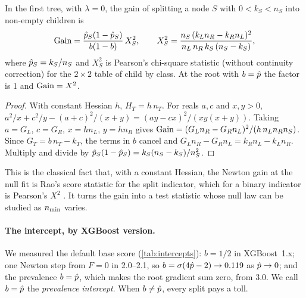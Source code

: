 \begin{proposition}\label{prop:chi2}
In the first tree, with $\lambda = 0$, the gain of splitting a node $S$ with $0 < k_S < n_S$ into non-empty children is
\begin{equation}\label{eq:chi2}
  \operatorname{Gain} = \frac{\hat p_S(1-\hat p_S)}{b(1-b)}\,X_S^2,\qquad X_S^2 = \frac{n_S\,(k_L n_R - k_R n_L)^2}{n_L\,n_R\,k_S\,(n_S-k_S)},
\end{equation}
where $\hat p_S = k_S/n_S$ and $X_S^2$ is Pearson's chi-square statistic (without continuity correction) for the $2\times 2$ table of child by class. At the root with $b = \hat p$ the factor is 1 and $\operatorname{Gain} = X^2$.
\end{proposition}

\begin{proof}
With constant Hessian $h$, $H_T = h\,n_T$. For reals $a, c$ and $x, y > 0$, $a^2/x + c^2/y - (a+c)^2/(x+y) = (ay-cx)^2/(xy(x+y))$. Taking $a = G_L$, $c = G_R$, $x = hn_L$, $y = hn_R$ gives $\operatorname{Gain} = (G_L n_R - G_R n_L)^2/(h\,n_L n_R n_S)$. Since $G_T = b\,n_T - k_T$, the terms in $b$ cancel and $G_L n_R - G_R n_L = k_R n_L - k_L n_R$. Multiply and divide by $\hat p_S(1-\hat p_S) = k_S(n_S-k_S)/n_S^2$.
\end{proof}

This is the classical fact that, with a constant Hessian, the Newton gain at the null fit is Rao's score statistic for the split indicator, which for a binary indicator is Pearson's $X^2$ \citep{rao1948large,agresti2013categorical,zeileis2008model}. It turns the gain into a test statistic whose null law can be studied as $n_{\min}$ varies.

\paragraph{The intercept, by XGBoost version.} We measured the default base score (\cref{tab:intercepts}): $b = 1/2$ in XGBoost~1.x; one Newton step from $F = 0$ in 2.0--2.1, so $b = \sigma(4\hat p-2) \to 0.119$ as $\hat p \to 0$; and the prevalence $b = \hat p$, which makes the root gradient sum zero, from 3.0. We call $b = \hat p$ the \emph{prevalence intercept}. When $b \ne \hat p$, every split pays a toll.

